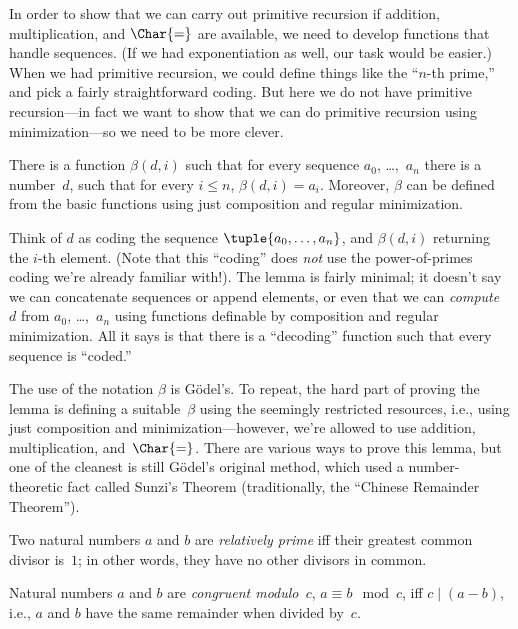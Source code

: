 \documentclass[../../../include/open-logic-section]{subfiles}
\begin{document}


In order to show that we can carry out primitive recursion if
addition, multiplication, and $\Char{=}$ are available, we need to
develop functions that handle sequences. (If we had exponentiation as
well, our task would be easier.) When we had primitive recursion, we
could define things like the ``$n$-th prime,'' and pick a fairly
straightforward coding. But here we do not have primitive
recursion---in fact we want to show that we can do primitive recursion
using minimization---so we need to be more clever.

\begin{lem}
There is a function $\beta(d,i)$ such that for every sequence $a_0$,
\dots,~$a_n$ there is a number~$d$, such that for every $i \le n$,
$\beta(d,i) = a_i$. Moreover, $\beta$ can be defined from the basic
functions using just composition and regular minimization.
\end{lem}

Think of $d$ as coding the sequence $\tuple{a_0, \dots, a_n}$, and
$\beta(d,i)$ returning the $i$-th element. (Note that this ``coding''
does \emph{not} use the power-of-primes coding we're already familiar
with!). The lemma is fairly minimal; it doesn't say we can concatenate
sequences or append elements, or even that we can \emph{compute}~$d$
from $a_0$, \dots,~$a_n$ using functions definable by composition and
regular minimization. All it says is that there is a ``decoding''
function such that every sequence is ``coded.''

The use of the notation $\beta$ is G\"odel's. To repeat, the hard part
of proving the lemma is defining a suitable~$\beta$ using the
seemingly restricted resources, i.e., using just composition and
minimization---however, we're allowed to use addition, multiplication,
and~$\Char{=}$. There are various ways to prove this lemma, but one of
the cleanest is still G\"odel's original method, which used a
number-theoretic fact called Sunzi's Theorem
(traditionally, the ``Chinese Remainder Theorem'').

\begin{defn}
Two natural numbers $a$ and $b$ are \emph{relatively prime} iff their
greatest common divisor is~$1$; in other words, they have no other
divisors in common.
\end{defn}

\begin{defn}
Natural numbers $a$ and $b$ are \emph{congruent modulo~$c$},
$a \equiv b \mod c$, iff $c \mid (a-b)$, i.e., $a$ and $b$ have the
same remainder when divided by~$c$.
\end{defn}
\end{document}
